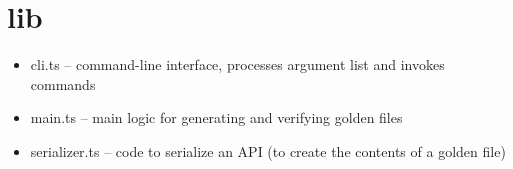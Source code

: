 \section{lib}


\begin{itemize}
  \item cli.ts – command-line interface, processes argument list and invokes commands
  \item main.ts – main logic for generating and verifying golden files
  \item serializer.ts – code to serialize an API (to create the contents of a golden file)
\end{itemize}












